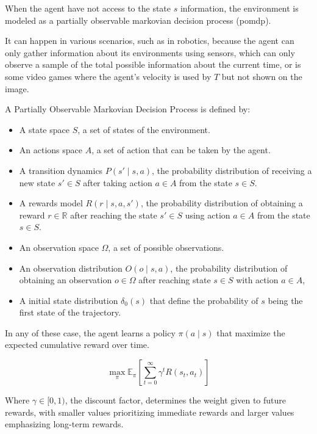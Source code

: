 When the agent have not access to the state $s$ information, the environment is modeled as a partially observable
markovian decision process (\acrshort{pomdp}).

It can happen in various scenarios, such as in robotics, because the agent can only gather information about its
environments using sensors, which can only observe a sample of the total possible information about the current time, or
is some video games where the agent's velocity is used by $T$ but not shown on the image.

\begin{definition}[POMDP]
    A Partially Observable Markovian Decision Process is defined by:
    \begin{itemize}
        \item A state space $S$, a set of states of the environment.
        \item An actions space $A$, a set of action that can be taken by the agent.
        \item A transition dynamics $P(s' \mid s,a)$, the probability distribution of receiving a new state $s' \in S$ after
    taking action $a \in A$ from the state $s \in S$.
        \item A rewards model $R(r \mid s, a, s')$, the probability distribution of obtaining a reward $r\in \mathbb{R}$ after
    reaching the state $s' \in S$ using action $a \in A$ from the state $s \in S$.
        \item An observation space $\Omega$, a set of possible observations.
        \item An observation distribution $O(o \mid s, a)$, the probability distribution of obtaining an observation $o \in \Omega$
    after reaching state $s \in S$ with action $a \in A$,
        \item A initial state distribution $\delta_0(s)$ that define the probability of $s$ being the first state of the
        trajectory.
    \end{itemize}
\end{definition}

In any of these case, the agent learns a policy $\pi(a \mid s)$ that maximize the expected cumulative reward over time.

\begin{equation}\label{eq:bg:rl:problem_definition}
    \max_\pi \mathbb{E}_\pi \left[ \sum_{t=0}^\infty \gamma^t R(s_t, a_t) \right]
\end{equation}

Where $\gamma \in [0, 1)$, the discount factor, determines the weight given to future rewards, with smaller values
prioritizing immediate rewards and larger values emphasizing long-term rewards.

